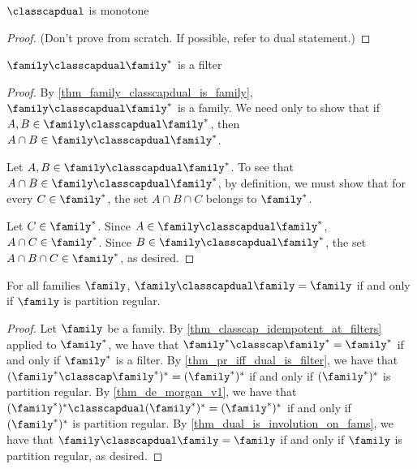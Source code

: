 \begin{theorem}
    \label{thm_classcapdual_monotone}
    \label{thm_classcapdual_is_monotonic}
    $\classcapdual$ is monotone
\end{theorem}

\begin{proof}
    (Don't prove from scratch.  If possible, refer to dual statement.)
\end{proof}

\begin{theorem}
    \label{thm_family_classcapdual_dual_is_filter}
    $\family \classcapdual \family^*$ is a filter
\end{theorem}

\begin{proof}
    
     By \cref{thm_family_classcapdual_is_family}, $\family \classcapdual \family^*$ is a family.  We need only to show that if $A, B \in \family \classcapdual \family^*$, then $A \cap B \in \family \classcapdual \family^*$.

    Let $A, B \in \family \classcapdual \family^*$.  To see that $A \cap B \in \family \classcapdual \family^*$, by definition, we must show that for every $C \in \family^*$, the set $A \cap B \cap C$ belongs to $\family^*$.

    Let $C \in \family^*$.  Since $A \in \family \classcapdual \family^*$, $A \cap C \in \family^*$.  Since $B \in \family \classcapdual \family^*$, the set $A \cap B \cap C \in \family^*$, as desired.
\end{proof}

\begin{theorem}
    \label{thm_classcapdual_idempotent_at_pr_families}
    \leanok{}
    For all families $\family$, $\family \classcapdual \family = \family$ if and only if $\family$ is partition regular.
\end{theorem}

\begin{proof}
    Let $\family$ be a family.  By \cref{thm_classcap_idempotent_at_filters} applied to $\family^*$, we have that $\family^* \classcap \family^* = \family^*$ if and only if $\family^*$ is a filter.  By \cref{thm_pr_iff_dual_is_filter}, we have that $(\family^* \classcap \family^*)^* = (\family^*)^*$ if and only if $(\family^*)^*$ is partition regular.  By \cref{thm_de_morgan_v1}, we have that $(\family^*)^* \classcapdual (\family^*)^* = (\family^*)^*$ if and only if $(\family^*)^*$ is partition regular.  By \cref{thm_dual_is_involution_on_fams}, we have that $\family \classcapdual \family = \family$ if and only if $\family$ is partition regular, as desired.
\end{proof}

